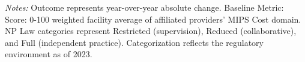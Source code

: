 \begin{table}[htbp]
    \centering
    \caption{Summary of Change in Facility Avg: MIPS Cost by Authority and Year}
    \label{tab:d_fac_mips_cost_score}
    \vspace{0.2cm}
    \vspace{0.1cm}
    \begin{minipage}{\textwidth}
        \footnotesize \textit{Notes:} Outcome represents year-over-year absolute change. Baseline Metric: Score: 0-100 weighted facility average of affiliated providers' MIPS Cost domain. NP Law categories represent Restricted (supervision), Reduced (collaborative), and Full (independent practice). Categorization reflects the regulatory environment as of 2023.
    \end{minipage}
\end{table}